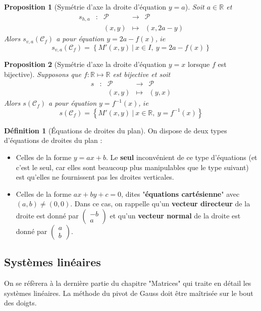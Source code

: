 \documentclass[french]{book}
\newcommand{\R}{\mathbb{R}}
\newcommand{\inv}{^{-1}}
\theoremstyle{plain}
\newtheorem{prop}{Proposition}[chapter]
\theoremstyle{definition}
\newtheorem{dfn}{Définition}[chapter]
\theoremstyle{remark}
\begin{document}
\begin{prop}[Symétrie d'axe la droite d'équation $y=a$]
Soit $a\in\R$ et $$\begin{array}{ccccc}s_{h,a}&:&\mathcal{P}&\rightarrow&\mathcal{P}\\&&(x,y)&\mapsto&(x,2a-y)\end{array}$$ Alors $s_{v,a}(\mathcal{C}_f)$ a pour équation $y=2a-f(x)$, $ie$ $$s_{v,a}(\mathcal{C}_f)=\left\{M'(x,y)\ | \ x\in I,\ y=2a-f(x)\right\}$$
\end{prop}
\begin{prop}[Symétrie d'axe la droite d'équation $y=x$ lorsque $f$ est bijective]
	Supposons que $f:\R\mapsto\R$ est bijective et soit $$\begin{array}{ccccc}s&:&\mathcal{P}&\rightarrow&\mathcal{P}\\&&(x,y)&\mapsto&(y,x)\end{array}$$ Alors $s(\mathcal{C}_f)$ a pour équation $y=f\inv(x)$, $ie$ $$s(\mathcal{C}_f)=\left\{M'(x,y)\ | \ x\in \R,\ y=f\inv(x)\right\}$$
\end{prop}
\begin{dfn}[Équations de droites du plan]
	On dispose de deux types d'équations de droites du plan :
	\begin{itemize}
		\item Celles de la forme $y=ax+b$. Le \textbf{seul} inconvénient de ce type d'équations (et c'est le seul, car elles sont beaucoup plus manipulables que le type suivant) est qu'elles ne fournissent pas les droites verticales.
		\item Celles de la forme $ax+by+c=0$, dites "\textbf{équations cartésienne}" avec $(a,b)\ne(0,0)$. Dans ce cas, on rappelle qu'un \textbf{vecteur directeur} de la droite est donné par $\displaystyle\begin{pmatrix}
			-b\\ a
		\end{pmatrix}$ et qu'un \textbf{vecteur normal} de la droite est donné par $\displaystyle\begin{pmatrix}
		a\\ b
		\end{pmatrix}$.
	\end{itemize}
\end{dfn}
\subsection{Systèmes linéaires}
On se réfèrera à la dernière partie du chapitre "Matrices" qui traite en détail les systèmes linéaires. La méthode du pivot de Gauss doit être maîtrisée sur le bout des doigts.
\end{document}

